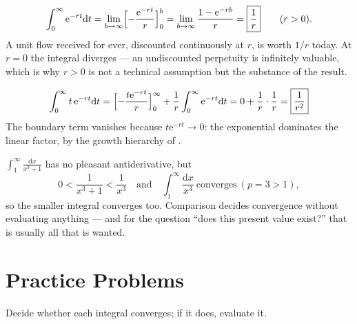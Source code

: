 \begin{worked}
\[
  \int_{0}^{\infty}\mathrm{e}^{-rt}\mathrm{d}t
  =\lim_{b\to\infty}\Bigl[-\frac{\mathrm{e}^{-rt}}{r}\Bigr]_{0}^{b}
  =\lim_{b\to\infty}\frac{1-\mathrm{e}^{-rb}}{r}
  =\boxed{\frac1r}\qquad (r>0).
\]
A unit flow received for ever, discounted continuously at $r$, is worth
$1/r$ today. At $r=0$ the integral diverges --- an undiscounted perpetuity
is infinitely valuable, which is why $r>0$ is not a technical assumption
but the substance of the result.

\[
  \int_{0}^{\infty}t\,\mathrm{e}^{-rt}\mathrm{d}t
  =\Bigl[-\frac{t\mathrm{e}^{-rt}}{r}\Bigr]_{0}^{\infty}
   +\frac1r\int_{0}^{\infty}\mathrm{e}^{-rt}\mathrm{d}t
  =0+\frac{1}{r}\cdot\frac1r=\boxed{\frac{1}{r^{2}}}
\]
The boundary term vanishes because $t\mathrm{e}^{-rt}\to0$: the exponential
dominates the linear factor, by the growth hierarchy of .

$\int_{1}^{\infty}\frac{\mathrm{d}x}{x^{3}+1}$ has no pleasant
antiderivative, but
\[
  0<\frac{1}{x^{3}+1}<\frac{1}{x^{3}}
  \quad\text{and}\quad
  \int_{1}^{\infty}\frac{\mathrm{d}x}{x^{3}}\ \text{converges}\ (p=3>1),
\]
so the smaller integral converges too. Comparison decides convergence
without evaluating anything --- and for the question ``does this present
value exist?'' that is usually all that is wanted.
\end{worked}

\section{Practice Problems}

Decide whether each integral converges; if it does, evaluate it.

